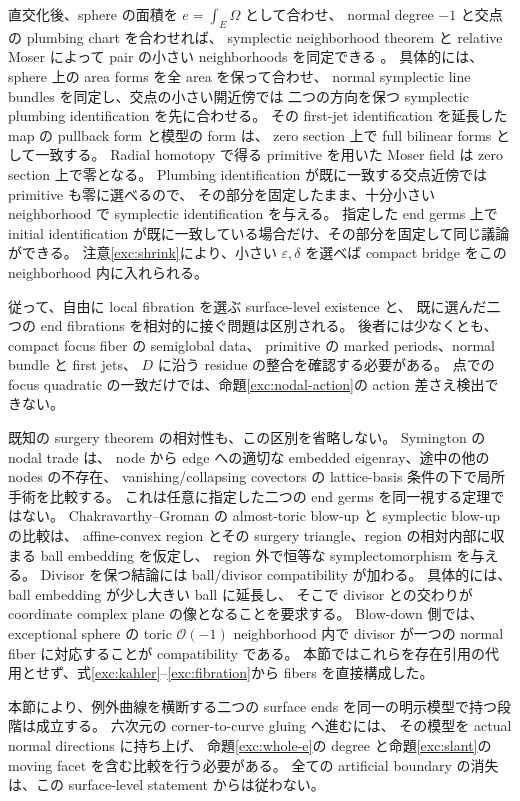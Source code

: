 直交化後、sphere の面積を $e=\int_E\Omega$ として合わせ、
normal degree $-1$ と交点の plumbing chart を合わせれば、
symplectic neighborhood theorem と relative Moser によって pair の小さい neighborhoods を同定できる
\cite[\S\S7.3,9.2]{cds-local}。
具体的には、sphere 上の area forms を全 area を保って合わせ、
normal symplectic line bundles を同定し、交点の小さい開近傍では
二つの方向を保つ symplectic plumbing identification を先に合わせる。
その first-jet identification を延長した map の pullback form と模型の form は、
zero section 上で full bilinear forms として一致する。
Radial homotopy で得る primitive を用いた Moser field は zero section 上で零となる。
Plumbing identification が既に一致する交点近傍では primitive も零に選べるので、
その部分を固定したまま、十分小さい neighborhood で symplectic identification を与える。
指定した end germs 上で initial identification が既に一致している場合だけ、その部分を固定して同じ議論ができる。
注意\ref{exc:shrink}により、小さい $\varepsilon,\delta$ を選べば compact bridge をこの neighborhood 内に入れられる。

従って、自由に local fibration を選ぶ surface-level existence と、
既に選んだ二つの end fibrations を相対的に接ぐ問題は区別される。
後者には少なくとも、compact focus fiber の semiglobal data、
primitive の marked periods、normal bundle と first jets、
$D$ に沿う residue の整合を確認する必要がある。
点での focus quadratic の一致だけでは、命題\ref{exc:nodal-action}の action 差さえ検出できない。

既知の surgery theorem の相対性も、この区別を省略しない。
Symington の nodal trade \cite[\S6, Lemma 6.3, Theorem 6.5]{symington} は、
node から edge への適切な embedded eigenray、途中の他の nodes の不存在、
vanishing/collapsing covectors の lattice-basis 条件の下で局所手術を比較する。
これは任意に指定した二つの end germs を同一視する定理ではない。
Chakravarthy--Groman \cite[Theorem 1.1, Definitions 2.2--2.3]{cg-at-blowup} の
almost-toric blow-up と symplectic blow-up の比較は、
affine-convex region とその surgery triangle、region の相対内部に収まる ball embedding を仮定し、
region 外で恒等な symplectomorphism を与える。
Divisor を保つ結論には ball/divisor compatibility が加わる。
具体的には、ball embedding が少し大きい ball に延長し、
そこで divisor との交わりが coordinate complex plane の像となることを要求する。
Blow-down 側では、exceptional sphere の toric $\mathcal O(-1)$ neighborhood 内で
divisor が一つの normal fiber に対応することが compatibility である。
本節ではこれらを存在引用の代用とせず、式\eqref{exc:kahler}--\eqref{exc:fibration}から fibers を直接構成した。

本節により、例外曲線を横断する二つの surface ends を同一の明示模型で持つ段階は成立する。
六次元の corner-to-curve gluing へ進むには、
その模型を actual normal directions に持ち上げ、
命題\ref{exc:whole-e}の degree と命題\ref{exc:slant}の moving facet を含む比較を行う必要がある。
全ての artificial boundary の消失は、この surface-level statement からは従わない。
